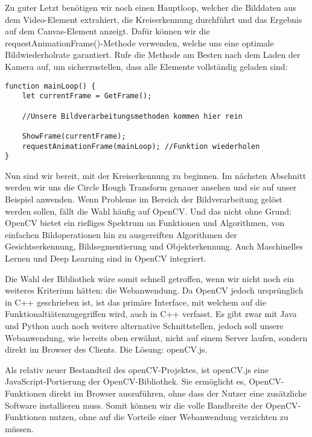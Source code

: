 Zu guter Letzt benötigen wir noch einen Hauptloop, welcher die Bilddaten aus dem Video-Element extrahiert, die Kreiserkennung durchführt und das Ergebnis auf dem Canvas-Element anzeigt. Dafür können wir die requestAnimationFrame()-Methode verwenden, welche uns eine optimale Bildwiederholrate garantiert. Rufe die Methode am Besten nach dem Laden der Kamera auf, um sicherzustellen, dass alle Elemente vollständig geladen sind:

\begin{lstlisting}[style=JavaScript]
function mainLoop() {
    let currentFrame = GetFrame();
    
    //Unsere Bildverarbeitungsmethoden kommen hier rein

    ShowFrame(currentFrame);
    requestAnimationFrame(mainLoop); //Funktion wiederholen
}
\end{lstlisting}

Nun sind wir bereit, mit der Kreiserkennung zu beginnen. Im nächsten Abschnitt werden wir uns die Circle Hough Transform genauer ansehen und sie auf unser Beispiel anwenden.
Wenn Probleme im Bereich der Bildverarbeitung gelöst werden sollen, fällt die Wahl häufig auf OpenCV. Und das nicht ohne Grund: OpenCV bietet ein rießiges Spektrum an Funktionen und Algorithmen, von einfachen Bildoperationen hin zu ausgereiften Algorithmen der Gesichtserkennung, Bildsegmentierung und Objekterkennung. Auch Maschinelles Lernen und Deep Learning sind in OpenCV integriert.

Die Wahl der Bibliothek wäre somit schnell getroffen, wenn wir nicht noch ein weiteres Kriterium hätten: die Webanwendung. Da OpenCV jedoch ursprünglich in C++ geschrieben ist, ist das primäre Interface, mit welchem auf die Funktionaltiätenzugegriffen wird, auch in C++ verfasst. Es gibt zwar mit Java und Python auch noch weitere alternative Schnittstellen, jedoch soll unsere Webanwendung, wie bereits oben erwähnt, nicht auf einem Server laufen, sondern direkt im Browser des Clients. Die Lösung: openCV.js.

Als relativ neuer Bestandteil des openCV-Projektes, ist openCV.js eine JavaScript-Portierung der OpenCV-Bibliothek. Sie ermöglicht es, OpenCV-Funktionen direkt im Browser auszuführen, ohne dass der Nutzer eine zusätzliche Software installieren muss. Somit können wir die volle Bandbreite der OpenCV-Funktionen nutzen, ohne auf die Vorteile einer Webanwendung verzichten zu müssen.